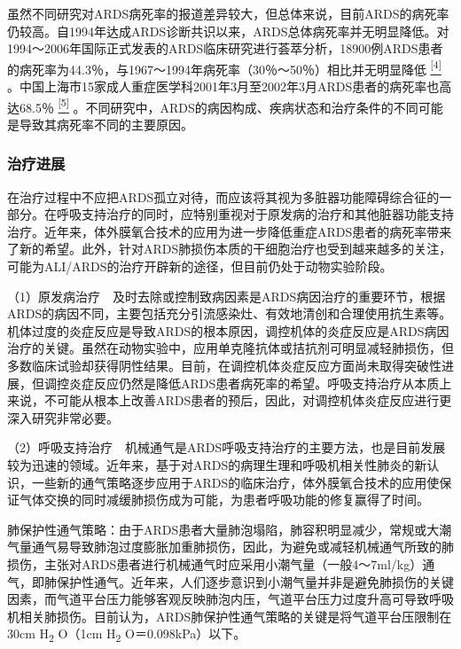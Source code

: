 虽然不同研究对ARDS病死率的报道差异较大，但总体来说，目前ARDS的病死率仍较高。自1994年达成ARDS诊断共识以来，ARDS总体病死率并无明显降低。对1994～2006年国际正式发表的ARDS临床研究进行荟萃分析，18900例ARDS患者的病死率为44.3％，与1967～1994年病死率（30％～50％）相比并无明显降低
\protect\hyperlink{text00011.htmlux5cux23ch4-10}{\textsuperscript{{[}4{]}}}
。中国上海市15家成人重症医学科2001年3月至2002年3月ARDS患者的病死率也高达68.5％
\protect\hyperlink{text00011.htmlux5cux23ch5-10}{\textsuperscript{{[}5{]}}}
。不同研究中，ARDS的病因构成、疾病状态和治疗条件的不同可能是导致其病死率不同的主要原因。

\subsubsection{治疗进展}

在治疗过程中不应把ARDS孤立对待，而应该将其视为多脏器功能障碍综合征的一部分。在呼吸支持治疗的同时，应特别重视对于原发病的治疗和其他脏器功能支持治疗。近年来，体外膜氧合技术的应用为进一步降低重症ARDS患者的病死率带来了新的希望。此外，针对ARDS肺损伤本质的干细胞治疗也受到越来越多的关注，可能为ALI/ARDS的治疗开辟新的途径，但目前仍处于动物实验阶段。

（1）原发病治疗　及时去除或控制致病因素是ARDS病因治疗的重要环节，根据ARDS的病因不同，主要包括充分引流感染灶、有效地清创和合理使用抗生素等。机体过度的炎症反应是导致ARDS的根本原因，调控机体的炎症反应是ARDS病因治疗的关键。虽然在动物实验中，应用单克隆抗体或拮抗剂可明显减轻肺损伤，但多数临床试验却获得阴性结果。目前，在调控机体炎症反应方面尚未取得突破性进展，但调控炎症反应仍然是降低ARDS患者病死率的希望。呼吸支持治疗从本质上来说，不可能从根本上改善ARDS患者的预后，因此，对调控机体炎症反应进行更深入研究非常必要。

（2）呼吸支持治疗　机械通气是ARDS呼吸支持治疗的主要方法，也是目前发展较为迅速的领域。近年来，基于对ARDS的病理生理和呼吸机相关性肺炎的新认识，一些新的通气策略逐步应用于ARDS的临床治疗，体外膜氧合技术的应用使保证气体交换的同时减缓肺损伤成为可能，为患者呼吸功能的修复赢得了时间。

肺保护性通气策略：由于ARDS患者大量肺泡塌陷，肺容积明显减少，常规或大潮气量通气易导致肺泡过度膨胀加重肺损伤，因此，为避免或减轻机械通气所致的肺损伤，主张对ARDS患者进行机械通气时应采用小潮气量（一般4～7ml/kg）通气，即肺保护性通气。近年来，人们逐步意识到小潮气量并非是避免肺损伤的关键因素，而气道平台压力能够客观反映肺泡内压，气道平台压力过度升高可导致呼吸机相关肺损伤。目前认为，ARDS肺保护性通气策略的关键是将气道平台压限制在30cm
H\textsubscript{2} O（1cm H\textsubscript{2} O＝0.098kPa）以下。

